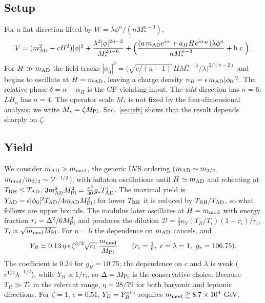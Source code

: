 \documentclass[11pt]{article}
\newcommand{\Mpl}{M_{\rm Pl}}
\newcommand{\vol}{\mathcal{V}}
\begin{document}
\subsection{Setup}
For a flat direction lifted by $W=\lambda\phi^n/(nM_*^{n-3})$,
\begin{equation}
V=(m_{\rm AD}^2-cH^2)|\phi|^2+\frac{\lambda^2|\phi|^{2n-2}}{M_*^{2n-6}}+\Big(\frac{(a\,m_{\rm AD}e^{i\alpha}+a_HHe^{i\alpha_H})\lambda\phi^n}{nM_*^{n-3}}+{\rm h.c.}\Big).
\label{eq:ADV}
\end{equation}
For $H\gg m_{\rm AD}$ the field tracks $|\phi_0|^2=\big(\sqrt{c/(n-1)}\,HM_*^{n-3}/\lambda\big)^{2/(n-2)}$ and begins to oscillate at $H=m_{\rm AD}$, leaving a charge density $n_B=\epsilon\,m_{\rm AD}|\phi_0|^2$. The relative phase $\delta=\alpha-\alpha_H$ is the CP-violating input. The $udd$ direction has $n=6$; $LH_u$ has $n=4$. The operator scale $M_*$ is not fixed by the four-dimensional analysis; we write $M_*=\zeta\Mpl$. Sec.~\ref{sec:eft} shows that the result depends sharply on $\zeta$.

\subsection{Yield}
We consider $m_{\rm AD}>m_{\rm mod}$, the generic LVS ordering ($m_{\rm AD}\sim m_{3/2}$, $m_{\rm mod}/m_{3/2}\sim\vol^{-1/2}$), with inflaton oscillations until $H\simeq m_{\rm AD}$ and reheating at $T_{\rm RH}\le T_{\rm AD}$, $3m_{\rm AD}^2\Mpl^2=\tfrac{\pi^2}{30}g_*T_{\rm AD}^4$. The maximal yield is $Y_{\rm AD}=\epsilon|\phi_0|^2T_{\rm AD}/4m_{\rm AD}\Mpl^2$; for lower $T_{\rm RH}$ it is reduced by $T_{\rm RH}/T_{\rm AD}$, so what follows are upper bounds. The modulus later oscillates at $H=m_{\rm mod}$ with energy fraction $r_i=\Delta^2/6\Mpl^2$ and produces the dilution $\mathcal D=\tfrac43\kappa_Y(T_R/T_i)(1-r_i)/r_i$, $T_i\propto\sqrt{m_{\rm mod}\Mpl}$. For $n=6$ the dependence on $m_{\rm AD}$ cancels, and
\begin{equation}
Y_B\simeq0.13\,\eta\,\epsilon\,\zeta^{3/2}\sqrt{c_\Gamma}\,\frac{m_{\rm mod}}{\Mpl}\qquad(r_i=\tfrac16,\ c=\lambda=1,\ g_*=106.75).
\label{eq:YAD}
\end{equation}
The coefficient is $0.24$ for $g_R=10.75$; the dependence on $c$ and $\lambda$ is weak ($c^{1/4}\lambda^{-1/2}$), while $Y_B\propto1/r_i$, so $\Delta=\Mpl$ is the conservative choice. Because $T_R\gg T_*$ in the relevant range, $\eta=28/79$ for both baryonic and leptonic directions. For $\zeta=1$, $\epsilon=0.51$, $Y_B=Y_B^{\rm obs}$ requires $m_{\rm mod}\gtrsim8.7\times10^9$ GeV.
\end{document}
